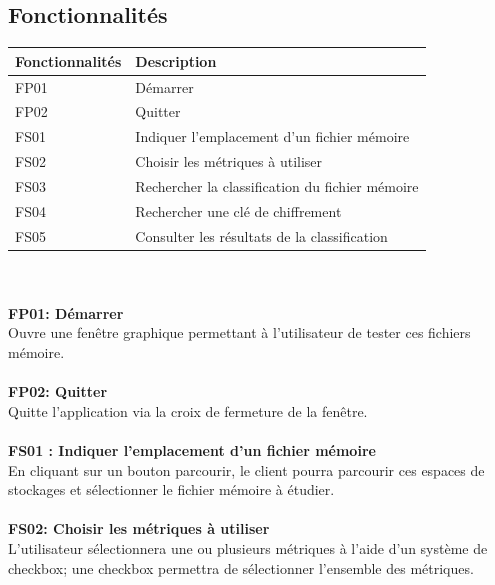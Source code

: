 \documentclass[a4paper, 12pt, twoside]{article}
\begin{document}
\subsection{Fonctionnalités}

\begin{tabular}{|l|l|}
    \hline
   Fonctionnalités & Description\\
   \hline
   FP01 & Démarrer\\
   \hline
   FP02 & Quitter\\
   \hline
   FS01 & Indiquer l'emplacement d'un fichier mémoire\\
   \hline
   FS02 & Choisir les métriques à utiliser\\
   \hline
   FS03 & Rechercher la classification du fichier mémoire\\
   \hline
   FS04 & Rechercher une clé de chiffrement\\
   \hline
   FS05 & Consulter les résultats de la classification\\
   \hline
\end{tabular}\\
\paragraph{}
{\bfseries FP01: Démarrer}\\
Ouvre une fenêtre graphique permettant à l'utilisateur de tester ces fichiers mémoire.
\paragraph{}
{\bfseries FP02: Quitter}\\
Quitte l'application via la croix de fermeture de la fenêtre.
\paragraph{}
{\bfseries FS01 : Indiquer l'emplacement d'un fichier mémoire}\\
En cliquant sur un bouton parcourir, le client pourra parcourir ces espaces de stockages et sélectionner le fichier mémoire à étudier.
\paragraph{}
{\bfseries FS02: Choisir les métriques à utiliser}\\
L'utilisateur sélectionnera une ou plusieurs métriques à l'aide d'un système de checkbox; une checkbox permettra de sélectionner l'ensemble des métriques.
\end{document}
